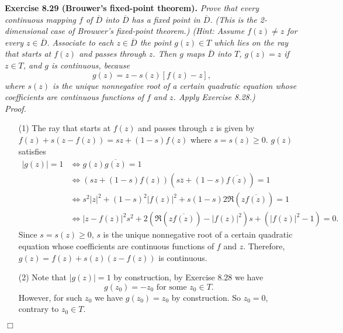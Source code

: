 \documentclass{article}
\begin{document}



\textbf{Exercise 8.29 (Brouwer's fixed-point theorem).}
\emph{Prove that every continuous mapping $f$ of $\overline{D}$ into $\overline{D}$
has a fixed point in $\overline{D}$.
(This is the 2-dimensional case of Brouwer's fixed-point theorem.)
(Hint: Assume $f(z) \neq z$ for every $z \in \overline{D}$.
Associate to each $z \in \overline{D}$ the point $g(z) \in T$
which lies on the ray that starts at $f(z)$ and passes through $z$.
Then $g$ maps $\overline{D}$ into $T$,
$g(z) = z$ if $z \in T$, and $g$ is continuous,
because
\[
  g(z) = z - s(z)[f(z)-z],
\]
where $s(z)$ is the unique nonnegative root of a certain quadratic equation whose
coefficients are continuous functions of $f$ and $z$.
Apply Exercise 8.28.)} \\

\emph{Proof.}
\begin{enumerate}
  \item[(1)]
  The ray that starts at $f(z)$ and passes through $z$
  is given by $f(z) + s(z - f(z)) = sz + (1-s)f(z)$ where $s = s(z) \geq 0$.
  $g(z)$ satisfies
  \begin{align*}
    |g(z)| = 1
    &\Longleftrightarrow
    g(z) \overline{g(z)} = 1 \\
    &\Longleftrightarrow
    (sz + (1-s)f(z))(s\overline{z} + (1-s)\overline{f(z)}) = 1 \\
    &\Longleftrightarrow
    s^2 |z|^2 + (1-s)^2 |f(z)|^2 + s(1-s) 2 \Re(z\overline{f(z)}) = 1 \\
    &\Longleftrightarrow
    |z-f(z)|^2 s^2 + 2(\Re(z\overline{f(z)}) - |f(z)|^2)s + (|f(z)|^2 - 1) = 0.
  \end{align*}
  Since $s = s(z) \geq 0$,
  $s$ is the unique nonnegative root of a certain quadratic equation whose
  coefficients are continuous functions of $f$ and $z$.
  Therefore, $g(z) = f(z) + s(z)(z - f(z))$ is continuous.

  \item[(2)]
  Note that $|g(z)| = 1$ by construction,
  by Exercise 8.28 we have
  \[
    g(z_0) = -z_0 \text{ for some } z_0 \in T.
  \]
  However, for such $z_0$ we have $g(z_0) = z_0$ by construction.
  So $z_0 = 0$, contrary to $z_0 \in T$.
\end{enumerate}
$\Box$ \\
\end{document}
